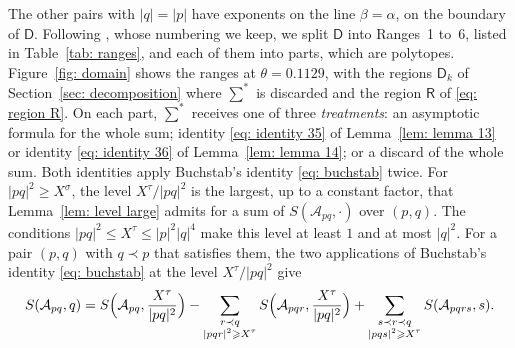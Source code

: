\documentclass{article}
\numberwithin{equation}{section}
\newcommand{\Le}{\leqslant}
\newcommand{\Ge}{\geqslant}
\begin{document}
The other pairs with $|q| = |p|$ have exponents on the line $\beta = \alpha$, on the boundary of $\mathsf{D}$. Following \citet[\S5]{harman2001gaussian}, whose numbering we keep, we split $\mathsf{D}$ into Ranges~1 to~6, listed in Table~\ref{tab: ranges}, and each of them into parts, which are polytopes. Figure~\ref{fig: domain} shows the ranges at $\theta = 0.1129$, with the regions $\mathsf{D}_k$ of Section~\ref{sec: decomposition} where $\sum^*$ is discarded and the region $\mathsf{R}$ of \eqref{eq: region R}. On each part, $\sum^*$ receives one of three \emph{treatments}: an asymptotic formula for the whole sum; identity \eqref{eq: identity 35} of Lemma~\ref{lem: lemma 13} or identity \eqref{eq: identity 36} of Lemma~\ref{lem: lemma 14}; or a discard of the whole sum. Both identities apply Buchstab's identity \eqref{eq: buchstab} twice. For $|pq|^2 \Ge X^{\sigma}$, the level $X^{\tau}/|pq|^2$ is the largest, up to a constant factor, that Lemma~\ref{lem: level large} admits for a sum of $S(\mathcal{A}_{pq}, \cdot)$ over $(p, q)$. The conditions $|pq|^2 \Le X^{\tau} \Le |p|^2|q|^4$ make this level at least $1$ and at most $|q|^2$. For a pair $(p, q)$ with $q \prec p$ that satisfies them, the two applications of Buchstab's identity \eqref{eq: buchstab} at the level $X^{\tau}/|pq|^2$ give
\begin{equation}
\label{eq: pair identity}
S(\mathcal{A}_{pq}, q) = S\Bigl(\mathcal{A}_{pq}, \frac{X^{\tau}}{|pq|^2}\Bigr) - \sum_{\substack{r \prec q \\ |pqr|^2 \Ge X^{\tau}}} S\Bigl(\mathcal{A}_{pqr}, \frac{X^{\tau}}{|pq|^2}\Bigr) + \sum_{\substack{s \prec r \prec q \\ |pqs|^2 \Ge X^{\tau}}} S(\mathcal{A}_{pqrs}, s).
\end{equation}
\end{document}
